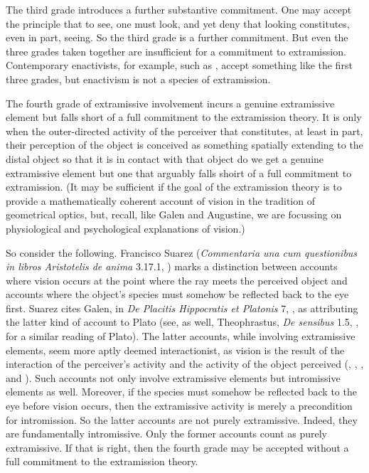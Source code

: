 \documentclass[12pt]{article}
\begin{document}
The third grade introduces a further substantive commitment. One may accept the principle that to see, one must look, and yet deny that looking constitutes, even in part, seeing. So the third grade is a further commitment. But even the three grades taken together are insufficient for a commitment to extramission. Contemporary enactivists, for example, such as \citet{Noe:2004fk}, accept something like the first three grades, but enactivism is not a species of extramission.

The fourth grade of extramissive involvement incurs a genuine extramissive element but falls short of a full commitment to the extramission theory. It is only when the outer-directed activity of the perceiver that constitutes, at least in part, their perception of the object is conceived as something spatially extending to the distal object so that it is in contact with that object do we get a genuine extramissive element but one that arguably falls shoirt of a full commitment to extramission. (It may be sufficient if the goal of the extramission theory is to provide a mathematically coherent account of vision in the tradition of geometrical optics, but, recall, like Galen and Augustine, we are focussing on physiological and psychological explanations of vision.) 

So consider the following. Francisco Suarez (\emph{Commentaria una cum questionibus in libros Aristotelis de anima} 3.17.1, \citealt{Castellote:1978qe}) marks a distinction between accounts where vision occurs at the point where the ray meets the perceived object and accounts where the object's species must somehow be reflected back to the eye first. Suarez cites Galen, in \emph{De Placitis Hippocratis et Platonis} 7, \citealt{Lacy:1980mk}, as attributing the latter kind of account to Plato (see, as well, Theophrastus, \emph{De sensibus} 1.5, \citealt{Stratton:1917vn}, for a similar reading of Plato). The latter accounts, while involving extramissive elements, seem more aptly deemed interactionist, as vision is the result of the interaction of the perceiver's activity and the activity of the object perceived (\citealt[22--23]{Smith:1996sh}, \citealt{Ierodiakonou:2005ly}, \citealt{Remes:2014en}, and \citealt{Squire:2016aa}). Such accounts not only involve extramissive elements but intromissive elements as well. Moreover, if the species must somehow be reflected back to the eye before vision occurs, then the extramissive activity is merely a precondition for intromission. So the latter accounts are not purely extramissive. Indeed, they are fundamentally intromissive. Only the former accounts count as purely extramissive. If that is right, then the fourth grade may be accepted without a full commitment to the extramission theory.
\end{document}
